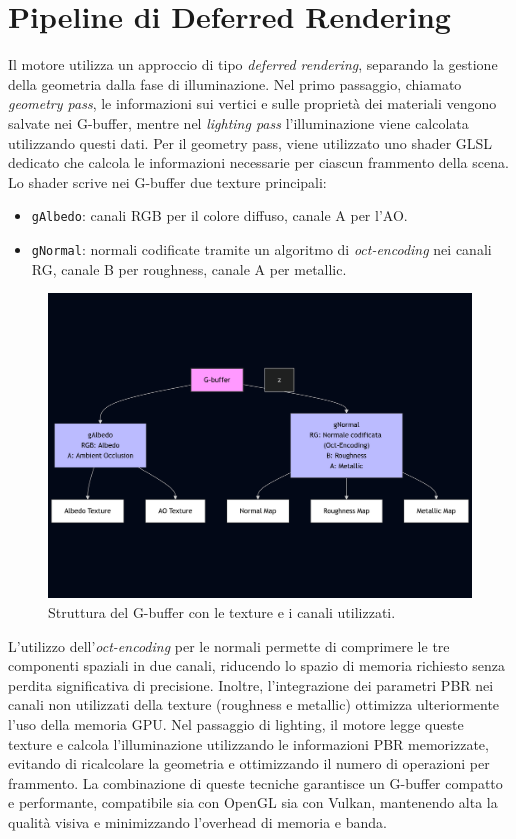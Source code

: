 \documentclass[12pt,a4paper,openright,twoside]{book}
\begin{document}
\section{Pipeline di Deferred Rendering}
Il motore utilizza un approccio di tipo \emph{deferred rendering}, separando la gestione della geometria dalla fase
di illuminazione. Nel primo passaggio, chiamato \emph{geometry pass}, le informazioni sui vertici e sulle proprietà dei
materiali vengono salvate nei G-buffer, mentre nel \emph{lighting pass} l'illuminazione viene calcolata utilizzando
questi dati.
Per il geometry pass, viene utilizzato uno shader GLSL dedicato che calcola le informazioni necessarie per ciascun
frammento della scena. Lo shader scrive nei G-buffer due texture principali:
\begin{itemize}
    \item \texttt{gAlbedo}: canali RGB per il colore diffuso, canale A per l'AO.
    \item \texttt{gNormal}: normali codificate tramite un algoritmo di \emph{oct-encoding} nei canali RG, canale B per roughness, canale A per metallic.
\end{itemize}
\begin{figure}[H]
    \centering
    \includegraphics[width=.8\linewidth]{figures/g_buffer_textures.png}
    \caption{Struttura del G-buffer con le texture e i canali utilizzati.}
    \label{fig:g-buffer-textures}
\end{figure}
L'utilizzo dell'\emph{oct-encoding} per le normali permette di comprimere le tre componenti spaziali in due canali,
riducendo lo spazio di memoria richiesto senza perdita significativa di precisione. Inoltre, l'integrazione dei parametri
PBR nei canali non utilizzati della texture (roughness e metallic) ottimizza ulteriormente l'uso della memoria GPU.
Nel passaggio di lighting, il motore legge queste texture e calcola l'illuminazione utilizzando le informazioni PBR
memorizzate, evitando di ricalcolare la geometria e ottimizzando il numero di operazioni per frammento.
La combinazione di queste tecniche garantisce un G-buffer compatto e performante, compatibile sia con OpenGL sia
con Vulkan, mantenendo alta la qualità visiva e minimizzando l'overhead di memoria e banda.
\end{document}
